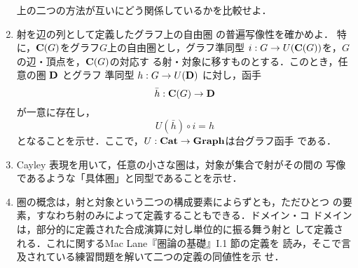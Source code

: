 \begin{enumerate}
       上の二つの方法が互いにどう関係しているかを比較せよ．
 \item 射を辺の列として定義したグラフ上の自由圏
       の普遍写像性を確かめよ．
       特に，${\bf C}(G)$をグラフ$G$上の自由圏とし，グラフ準同型
       $i: G \to U({\bf C}(G))$を，$G$の辺・頂点を，${\bf C}(G)$の対応す
       る射・対象に移すものとする．このとき，任意の圏 ${\bf D}$ とグラフ
       準同型 $h: G \to U({\bf D})$ に対し，函手
       \[
	\bar h: {\bf C}(G) \to {\bf D}
       \]
       が一意に存在し，
       \[
	U(\bar h) \circ i = h
       \]
       となることを示せ．ここで，$U: \mathbf{Cat} \to {\bf Graph}$は台グラフ函手
       である．
 \item Cayley 表現を用いて，任意の小さな圏は，対象が集合で射がその間の
       写像であるような「具体圏」と同型であることを示せ．
 \item 圏の概念は，射と対象という二つの構成要素によらずとも，ただひとつ
       の要素，すなわち射のみによって定義することもできる．ドメイン・コ
       ドメインは，部分的に定義された合成演算に対し単位的に振る舞う射と
       して定義される．これに関するMac Lane『圏論の基礎』I.1 節の定義を
       読み，そこで言及されている練習問題を解いて二つの定義の同値性を示
       せ．
\end{enumerate}
